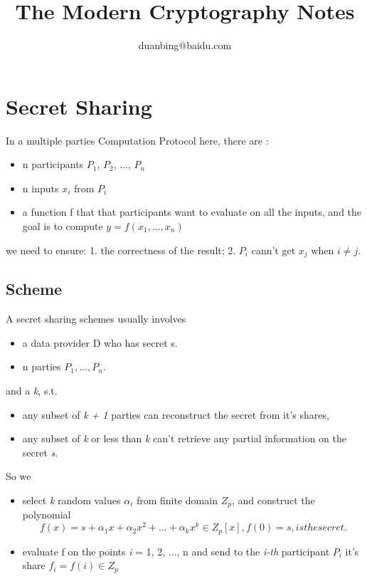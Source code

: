 \documentclass[a4paper,11pt]{article}
\author{duanbing@baidu.com}
\title{The Modern Cryptography Notes}
\begin{document}
\maketitle  
\tableofcontents

 \section{Secret Sharing}
 
 In a multiple parties Computation Protocol here, there are :

 \begin{itemize}
 \item  n participants $P_{1}$, $P_{2}$, ..., $P_{n}$
 \item  n inputs $x_i$ from ${P_i}$
 \item a function f that that participants want to evaluate on all the inputs,  and the goal is to compute  $ y = f(x_1, ..., x_n) $ 
 \end{itemize}
 
 we need to ensure: 1.  the correctness of the result; 2.  $P_i$ cann't get $x_j$ when $ i \neq j$.

\subsection{Scheme}

A secret sharing schemes usually involves 
\begin{itemize}
\item a data provider D who has secret s.
\item n parties $P_1, ... , P_n$.
\end{itemize}

and a \textit{k},  s.t.

\begin{itemize}
\item   any subset of \textit{k + 1} parties can reconstruct the secret from it's shares, 
\item  any subset of \textit{k} or less than \textit{k} can't retrieve any partial information on the secret \textit{s}.
\end{itemize}

So we  

\begin {itemize}
\item select \textit{k} random values $ \alpha_i  $  from finite domain $Z_p$, and construct the polynomial 
\begin{displaymath}
f(x) = s + \alpha_{1}x + \alpha_{2}x^{2} + ... + \alpha_{k}x^{k}   \in Z_{p}[x],  f(0) = s, is the secret.
\end{displaymath}

\item evaluate f on  the points \textit{i} = 1, 2, ..., n and send to the \textit{i-th} participant $P_i$ it's share $f_i = f(i) \in Z_p$ 

\end{itemize}
\end{document}
